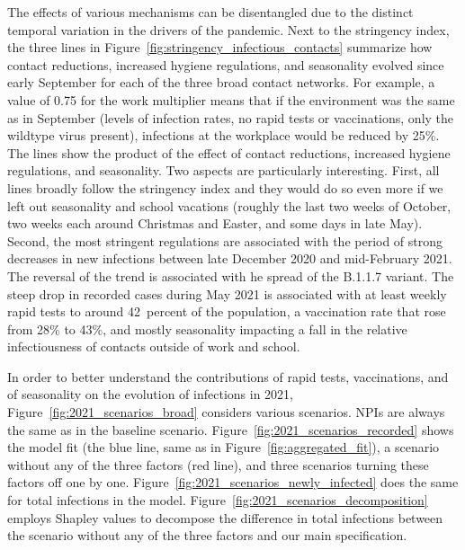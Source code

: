 The effects of various mechanisms can be disentangled due to the distinct temporal
variation in the drivers of the pandemic. Next to the stringency index, the three lines
in Figure~\ref{fig:stringency_infectious_contacts} summarize how contact reductions, increased hygiene
regulations, and seasonality evolved since early September for each of the three broad
contact networks. For example, a value of 0.75 for the work multiplier means that if the
environment was the same as in September (levels of infection rates, no rapid tests or
vaccinations, only the wildtype virus present), infections at the workplace would be
reduced by 25\%. The lines show the product of the effect of contact reductions,
increased hygiene regulations, and seasonality. Two aspects are particularly
interesting. First, all lines broadly follow the stringency index and they would do so
even more if we left out seasonality and school vacations (roughly the last two weeks of
October, two weeks each around Christmas and Easter, and some days in late May). Second,
the most stringent regulations are associated with the period of strong decreases in new
infections between late December 2020 and mid-February 2021. The reversal of the trend
is associated with he spread of the B.1.1.7 variant. The steep drop in recorded cases
during May 2021 is associated with at least weekly rapid tests to around 42~percent of
the population, a vaccination rate that rose from 28\% to 43\%, and mostly seasonality
impacting a fall in the relative infectiousness of contacts outside of work and school.

In order to better understand the contributions  of rapid tests, vaccinations, and of
seasonality on the evolution of infections in 2021,
Figure~\ref{fig:2021_scenarios_broad} considers various scenarios. NPIs are always the
same as in the baseline scenario. Figure~\ref{fig:2021_scenarios_recorded} shows the
model fit (the blue line, same as in Figure~\ref{fig:aggregated_fit}), a scenario
without any of the three factors (red line), and three scenarios turning these factors
off one by one. Figure~\ref{fig:2021_scenarios_newly_infected} does the same for total
infections in the model. Figure~\ref{fig:2021_scenarios_decomposition} employs Shapley
values \citep{Shapley2016} to decompose the difference in total infections
between the scenario without any of the three factors and our main specification.

